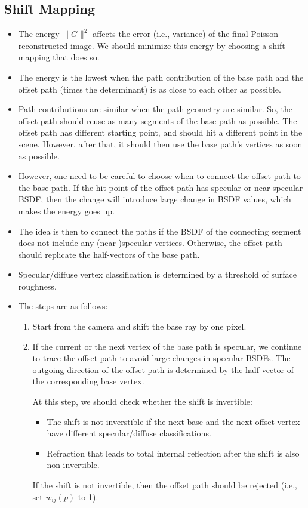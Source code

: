 \documentclass[10pt]{article}
\begin{document}
  \subsection{Shift Mapping}
  \begin{itemize}
  	\item The energy $\| G \|^2$ affects the error (i.e., variance) of the final Poisson reconstructed image.  We should minimize this energy by choosing a shift mapping that does so.

  	\item The energy is the lowest when the path contribution of the base path and the offset path (times the determinant) is as close to each other as possible.

  	\item Path contributions are similar when the path geometry are similar.  So, the offset path should reuse as many segments of the base path as possible.  The offset path has different starting point, and should hit a different point in the scene.  However, after that, it should then use the base path's vertices as soon as possible.

  	\item However, one need to be careful to choose when to connect the offset path to the base path.  If the hit point of the offset path has specular or near-specular BSDF, then the change will introduce large change in BSDF values, which makes the energy goes up.

  	\item The idea is then to connect the paths if the BSDF of the connecting segment does not include any (near-)specular vertices.  Otherwise, the offset path should replicate the half-vectors of the base path.

  	\item Specular/diffuse vertex classification is determined by a threshold of surface roughness.

  	\item The steps are as follows:
  	\begin{enumerate}
  		\item Start from the camera and shift the base ray by one pixel.
  		\item If the current or the next vertex of the base path is specular, we continue to trace the offset path to avoid large changes in specular BSDFs.  The outgoing direction of the offset path is determined by the half vector of the corresponding base vertex.  

  		At this step, we should check whether the shift is invertible:
  		\begin{itemize}
  			\item The shift is not inverstible if the next base and the next offset vertex have different specular/diffuse classifications.
  			\item Refraction that leads to total internal reflection after the shift is also non-invertible.
  		\end{itemize}
  		If the shift is not invertible, then the offset path should be rejected (i.e., set $w_{ij}(\bar p)$ to 1).


\end{enumerate}
\end{itemize}
\end{document}
